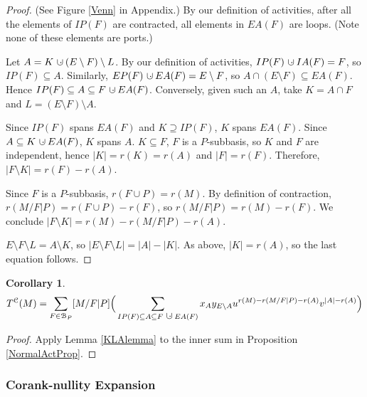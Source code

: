 \documentclass[12pt,leqno]{amsart}
\newtheorem{cor}[lem]{Corollary}
\theoremstyle{remark}
\newcommand{\dunion}
{\mbox{\hbox{\hskip6pt$\cdot$\hskip-5.50pt$\cup$\hskip2pt}}}
\newcommand{\Card}[1]{\ensuremath{{\left|#1\right|}}}
\begin{document}
\begin{proof}
(See Figure \ref{Venn} in Appendix.) By our definition of activities,
after all the elements of $IP(F)$ are contracted, all elements 
in $EA(F)$ are loops.
(Note none of these elements are ports.)

Let 
$A=K\dunion (E\setminus F)\setminus L$.
By our definition of activities,
$IP(F)\dunion IA(F)=F$, so $IP(F)\subseteq A$.
Similarly,  
$EP(F)\dunion EA(F)=E\setminus F$, so 
$A\cap(E\setminus F)\subseteq EA(F)$.
Hence 
$IP(F)\subseteq A\subseteq F\dunion EA(F)$.
Conversely, given such an $A$, 
take $K=A\cap F$ and $L=(E\setminus F)\setminus A$.

Since $IP(F)$ spans $EA(F)$ and $K\supseteq IP(F)$, $K$ spans $EA(F)$.
Since $A\subseteq K\dunion EA(F)$, $K$ spans $A$.
$K\subseteq F$, $F$ is a $P$-subbasis, so $K$ and $F$ are independent,
hence $\Card{K}=r(K)=r(A)$ and $\Card{F}=r(F)$.  
Therefore, $\Card{F\setminus K}=r(F)-r(A)$.

Since $F$ is a $P$-subbasis, $r(F\cup P)=r(M)$.
By definition of contraction, $r(M/F|P)=r(F\cup P) - r(F)$,
so $r(M/F|P)=r(M)-r(F)$.  We conclude 
$\Card{F\setminus K}=r(M)-r(M/F|P)-r(A)$.

$E\setminus F\setminus L = A\setminus K$, so
$\Card{E\setminus F\setminus L} = \Card{A}-\Card{K}$.
As above, $\Card{K}=r(A)$, so the last equation follows.
\end{proof}


\begin{cor}
\begin{equation}
\label{FIntervalExpansion}
T^{\mathcal{C}}(M)=
\sum_{F\in \mathcal{B}_P}[M/F|P]
\Big(
\sum_{IP(F)\subseteq A \subseteq F\dunion EA(F)}
 x_{A}
 y_{E\setminus A}
 u^{r(M)-r(M/F|P)-r(A)}
 v^{\Card{A}-r(A)}
\Big)
\end{equation}
\end{cor}

\begin{proof}
Apply Lemma \ref{KLAlemma} to the inner sum in
Proposition \ref{NormalActProp}.
\end{proof}

\subsubsection{Corank-nullity Expansion}
\end{document}
